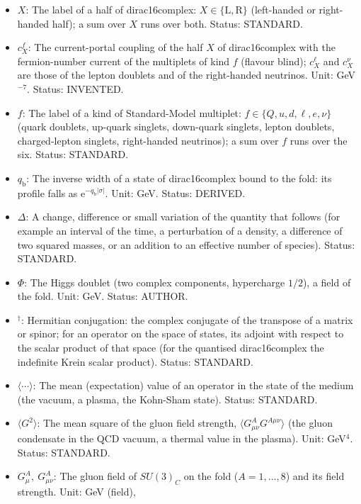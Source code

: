 \documentclass[
  10pt,
]{article}
\begin{document}
\begin{itemize}
\item
  \(X\): The label of a half of dirac16complex:
  \(X \in \{\mathrm{L}, \mathrm{R}\}\) (left-handed or right-handed
  half); a sum over \(X\) runs over both. Status: STANDARD.
\item
  \(c^{f}_X\): The current-portal coupling of the half \(X\) of
  dirac16complex with the fermion-number current of the multiplets of
  kind \(f\) (flavour blind); \(c^{\ell}_X\) and \(c^{\nu}_X\) are those
  of the lepton doublets and of the right-handed neutrinos. Unit:
  GeV\(^{-7}\). Status: INVENTED.
\item
  \(f\): The label of a kind of Standard-Model multiplet:
  \(f \in \{Q, u, d, \ell, e, \nu\}\) (quark doublets, up-quark
  singlets, down-quark singlets, lepton doublets, charged-lepton
  singlets, right-handed neutrinos); a sum over \(f\) runs over the six.
  Status: STANDARD.
\item
  \(q_{\mathrm{b}}\): The inverse width of a state of dirac16complex
  bound to the fold: its profile falls as
  \(\mathrm{e}^{-q_{\mathrm{b}}\lvert\sigma\rvert}\). Unit: GeV. Status:
  DERIVED.
\item
  \(\Delta\): A change, difference or small variation of the quantity
  that follows (for example an interval of the time, a perturbation of a
  density, a difference of two squared masses, or an addition to an
  effective number of species). Status: STANDARD.
\item
  \(\Phi\): The Higgs doublet (two complex components, hypercharge
  \(1/2\)), a field of the fold. Unit: GeV. Status: AUTHOR.
\item
  \({}^\dagger\): Hermitian conjugation: the complex conjugate of the
  transpose of a matrix or spinor; for an operator on the space of
  states, its adjoint with respect to the scalar product of that space
  (for the quantised dirac16complex the indefinite Krein scalar
  product). Status: STANDARD.
\item
  \(\langle\cdots\rangle\): The mean (expectation) value of an operator
  in the state of the medium (the vacuum, a plasma, the Kohn-Sham
  state). Status: STANDARD.
\item
  \(\langle G^2\rangle\): The mean square of the gluon field strength,
  \(\langle G^A_{\mu\nu}G^{A\mu\nu}\rangle\) (the gluon condensate in
  the QCD vacuum, a thermal value in the plasma). Unit: GeV\(^4\).
  Status: STANDARD.
\item
  \(G^A_\mu,\ G^A_{\mu\nu}\): The gluon field of \(SU(3)_C\) on the fold
  (\(A = 1, \dots, 8\)) and its field strength. Unit: GeV (field),

\end{itemize}
\end{document}
